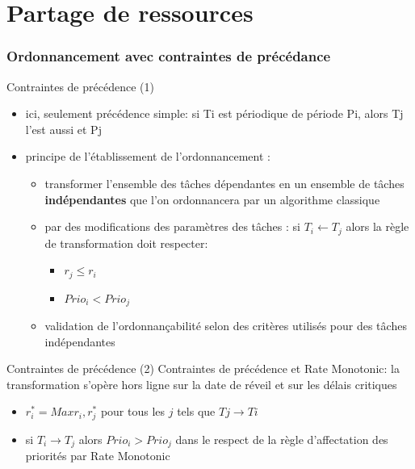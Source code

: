 \part{Partage de ressources}

\section{Ordonnancement avec contraintes de précédance}

\begin{frame}{Contraintes de précédence (1)} 
  \begin{itemize}
  \item ici, seulement précédence simple: si Ti est périodique de période Pi, alors Tj l'est aussi et Pj 
  \item principe de l'établissement de l'ordonnancement :
    \begin{itemize} 
    \item transformer l'ensemble des tâches dépendantes en un ensemble de tâches \textbf{indépendantes} que l'on ordonnancera par un algorithme classique
    \item par des modifications des paramètres des tâches : si $T_i \leftarrow T_j$ alors la règle de transformation doit respecter:
      \begin{itemize} 
      \item $r_j \le r_i$
      \item $Prio_i < Prio_j$
      \end{itemize} 
    \item validation de l'ordonnançabilité selon des critères utilisés pour des tâches indépendantes
    \end{itemize}
  \end{itemize}
\end{frame}

\begin{frame}{Contraintes de précédence (2)} 
  Contraintes de précédence et Rate Monotonic:
  la transformation s'opère hors ligne sur la date de réveil et sur les délais critiques
  \begin{itemize} 
  \item $r^*_i = Max{r_i, r^*_j}$ pour tous les $j$ tels que $Tj →  Ti$
  \item si $T_i  → T_j$ alors $Prio_i > Prio_j$ dans  le respect de la
    règle d'affectation des priorités par Rate Monotonic
  \end{itemize}
\end{frame} 

